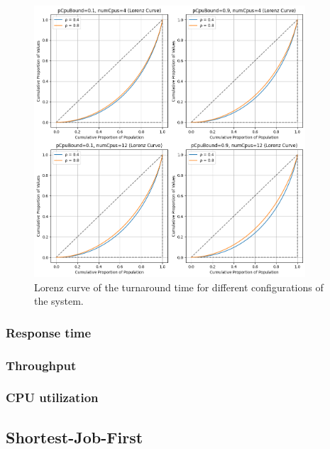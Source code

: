 \begin{figure}
    \captionsetup{type=figure}
    \centering
    \includegraphics[width=0.9\textwidth]{./images/04/fcfs/lorenz.png}
    \caption{Lorenz curve of the turnaround time for different configurations of the system.}
    \label{fig:fcfs_lorenz}
\end{figure}

\subsubsection{Response time}
\subsubsection{Throughput}
\subsubsection{CPU utilization}
\subsection{Shortest-Job-First}